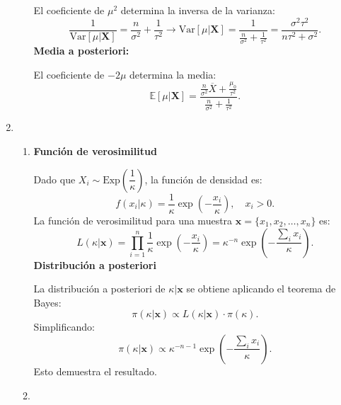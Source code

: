\begin{enumerate}[label=\color{red}\textbf{\arabic*)}]
\begin{enumerate}[label=Paso \arabic*:]
    El coeficiente de $\mu^2$ determina la inversa de la varianza: \[
      \dfrac{1}{\mathrm{Var}[\mu|\mathbf{X}]}=\dfrac{n}{\sigma^2}+\dfrac{1}{\tau^2}\longrightarrow \mathrm{Var}[\mu|\mathbf{X}]=\dfrac{1}{\frac{n}{\sigma^2}+\frac{1}{\tau^2}}=\dfrac{\sigma^2\tau^2}{n\tau^2+\sigma^2}.
    \] 
    \textbf{Media a posteriori:} 

    El coeficiente de $-2\mu$ determina la media: \[
      \mathbb{E}[\mu|\mathbf{X}]=\dfrac{\frac{n}{\sigma^2}\overline{X}+\frac{\mu_0}{\tau^2}  }{\frac{n}{\sigma^2}+\frac{1}{\tau^2}  }.
    \] 
\end{enumerate}

\item {}
    \begin{enumerate}[label=\color{red}\textbf{\alph*)}]
        \item {} 

          \textbf{Función de verosimilitud}

          Dado que $X_i\sim \mathrm{Exp}\left( \dfrac{1}{\kappa} \right) $, la función de densidad es: \[
          f(x_i|\kappa)=\dfrac{1}{\kappa}\exp\left( -\dfrac{x_i}{\kappa} \right) ,\quad x_i>0.
          \] 
          La función de verosimilitud para una muestra $\mathbf{x}=\{x_1,x_2,\dots,x_{n}\} $ es: \[
          L(\kappa|\mathbf{x})=\prod_{i=1}^{n} \dfrac{1}{\kappa}\exp\left( -\dfrac{x_i}{\kappa} \right)=\kappa^{-n}\exp\left( -\dfrac{\sum_i x_i}{\kappa} \right) .
          \] 
          \textbf{Distribución a posteriori}

          La distribución a posteriori de $\kappa|\mathbf{x}$ se obtiene aplicando el teorema de Bayes: \[
          \pi(\kappa|\mathbf{x})\propto L(\kappa|\mathbf{x})\cdot \pi(\kappa).
          \] 
          Simplificando: \[
          \pi(\kappa|\mathbf{x})\propto \kappa^{-n-1}\exp\left( -\dfrac{\sum_i x_i}{\kappa} \right) .
          \] 
          Esto demuestra el resultado.
        \item {}


\end{enumerate}
\end{enumerate}
